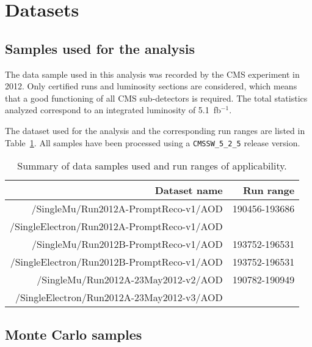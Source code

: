 \section{Datasets}
\label{sec:technicalities}

\subsection{Samples used for the analysis}

The data sample used in this analysis was recorded by the CMS experiment in 2012.
Only certified runs and luminosity sections are considered, which means that a good functioning
of all CMS sub-detectors is required. The total statistics analyzed correspond to an integrated
luminosity of 5.1~fb$^{-1}$. %

The dataset used for the analysis and the corresponding run ranges are listed in Table~\ref{tab:datasets}.
All samples have been processed using a \texttt{CMSSW\_5\_2\_5} release version.

\begin{table}[htb]
  \begin{center}
  \begin{tabular}{r|r}
  \hline
  Dataset name & Run range \\
  \hline
  /SingleMu/Run2012A-PromptReco-v1/AOD   & 190456-193686  \\
  /SingleElectron/Run2012A-PromptReco-v1/AOD   &            \\ 
  \hline
  /SingleMu/Run2012B-PromptReco-v1/AOD   &  193752-196531  \\
  /SingleElectron/Run2012B-PromptReco-v1/AOD         &  193752-196531    \\
  \hline
  /SingleMu/Run2012A-23May2012-v2/AOD   &  190782-190949  \\
  /SingleElectron/Run2012A-23May2012-v3/AOD   &         \\
  \hline
  \hline
  \end{tabular}
  \end{center}
  \caption{Summary of data samples used and run ranges of applicability.}
  \label{tab:datasets}
\end{table}%

\subsection{Monte Carlo samples}


